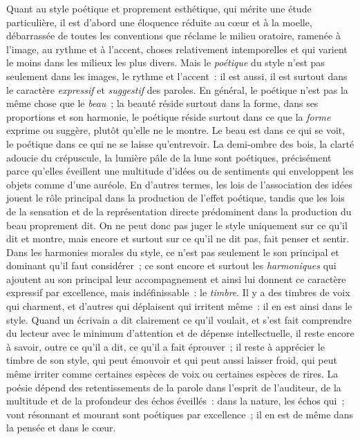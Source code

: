 \documentclass[french,twoside]{book} %
\begin{document}
Quant au style poétique et proprement esthétique, qui mérite une étude particulière, il est d’abord une éloquence réduite au cœur et à la moelle, débarrassée de toutes les conventions que réclame le milieu oratoire, ramenée à l’image, au rythme et à l’accent, choses relativement intemporelles et qui varient le moins dans les milieux les plus divers. Mais le \emph{poétique} du style n’est pas seulement dans les images, le rythme et l’accent : il est aussi, il est surtout dans le caractère \emph{expressif} et \emph{suggestif} des paroles. En général, le poétique n’est pas la même chose que le \emph{beau} ; la beauté réside surtout dans la forme, dans ses proportions et son harmonie, le poétique réside surtout dans ce que la \emph{forme} exprime ou suggère, plutôt qu’elle ne le montre. Le beau est dans ce qui se voit, le poétique dans ce qui ne se laisse qu’entrevoir. La demi-ombre des bois, la clarté adoucie du crépuscule, la lumière pâle de la lune sont poétiques, précisément parce qu’elles éveillent une multitude d’idées ou de sentiments qui enveloppent les objets comme d’une auréole. En d’autres termes, les lois de l’association des idées jouent le rôle principal dans la production de l’effet poétique, tandis que les lois de la sensation et de la représentation directe prédominent dans la production du beau proprement dit. On ne peut donc pas juger le style uniquement sur ce qu’il dit et montre, mais encore et surtout sur ce qu’il ne dit pas, fait penser et sentir. Dans les harmonies morales du style, ce n’est pas seulement le son principal et dominant qu’il faut considérer ; ce sont encore et surtout les \emph{harmoniques} qui ajoutent au son principal leur accompagnement et ainsi lui donnent ce caractère expressif par excellence, mais indéfinissable : le \emph{timbre}. Il y a des timbres de voix qui charment, et d’autres qui déplaisent qui irritent même : il en est ainsi dans le style. Quand un écrivain a dit clairement ce qu’il voulait, et s’est fait comprendre du lecteur avec le minimum d’attention et de dépense intellectuelle, il reste encore à savoir, outre ce qu’il a dit, ce qu’il a fait éprouver ; il reste à apprécier le timbre de son style, qui peut émouvoir et qui peut aussi laisser froid, qui peut même irriter comme certaines espèces de voix ou certaines espèces de rires. La poésie dépend des retentissements de la parole dans l’esprit de l’auditeur, de la multitude et de la profondeur des échos éveillés : dans la nature, les échos qui ; vont résonnant et mourant sont poétiques par excellence ; il en est de même dans la pensée et dans le cœur.\par
\end{document}
